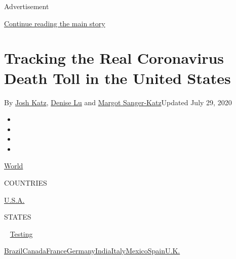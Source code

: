 Advertisement

\protect\hyperlink{after-top}{Continue reading the main story}

\hypertarget{tracking-the-real-coronavirus-death-toll-in-the-united-states}{%
\section{Tracking the Real Coronavirus Death Toll in the United
States}\label{tracking-the-real-coronavirus-death-toll-in-the-united-states}}

By \href{https://www.nytimes.com/by/josh-katz}{Josh Katz},
\href{https://www.nytimes.com/by/denise-lu}{Denise Lu} and
\href{https://www.nytimes.com/by/margot-sanger-katz}{Margot
Sanger-Katz}Updated July 29, 2020

\begin{itemize}
\item
\item
\item
\item
\end{itemize}

\href{https://www.nytimes.com/interactive/2020/world/coronavirus-maps.html}{World}~

COUNTRIES

\textbar{}
\href{https://www.nytimes.com/interactive/2020/us/coronavirus-us-cases.html}{U.S.A.}~

STATES

~
\href{https://www.nytimes.com/interactive/2020/us/coronavirus-testing.html}{Testing}

\href{https://www.nytimes.com/interactive/2020/world/americas/brazil-coronavirus-cases.html}{Brazil}\href{https://www.nytimes.com/interactive/2020/world/canada/canada-coronavirus-cases.html}{Canada}\href{https://www.nytimes.com/interactive/2020/world/europe/france-coronavirus-cases.html}{France}\href{https://www.nytimes.com/interactive/2020/world/europe/germany-coronavirus-cases.html}{Germany}\href{https://www.nytimes.com/interactive/2020/world/asia/india-coronavirus-cases.html}{India}\href{https://www.nytimes.com/interactive/2020/world/europe/italy-coronavirus-cases.html}{Italy}\href{https://www.nytimes.com/interactive/2020/world/americas/mexico-coronavirus-cases.html}{Mexico}\href{https://www.nytimes.com/interactive/2020/world/europe/spain-coronavirus-cases.html}{Spain}\href{https://www.nytimes.com/interactive/2020/world/europe/united-kingdom-coronavirus-cases.html}{U.K.}


